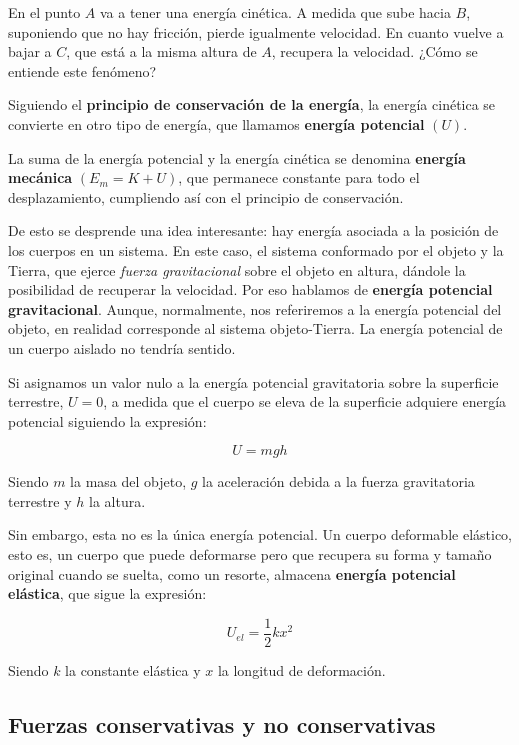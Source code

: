En el punto \(A\) va a tener una energía cinética.
A medida que sube hacia \(B\), suponiendo que no hay fricción,
pierde igualmente velocidad.
En cuanto vuelve a bajar a \(C\), que está a la misma altura de \(A\),
recupera la velocidad. ¿Cómo se entiende este fenómeno?

Siguiendo el \textbf{principio de conservación de la energía}, 
la energía cinética se convierte en otro tipo de energía,
que llamamos \textbf{energía potencial} \((U)\).

La suma de la energía potencial y la energía cinética se denomina 
\textbf{energía mecánica} \((E_m = K + U)\),
que permanece constante para todo el desplazamiento,
cumpliendo así con el principio de conservación.

De esto se desprende una idea interesante:
hay energía asociada a la posición de los cuerpos en un sistema.
En este caso, el sistema conformado por el objeto y la Tierra,
que ejerce \textit{fuerza gravitacional} sobre el objeto en altura,
dándole la posibilidad de recuperar la velocidad.
Por eso hablamos de \textbf{energía potencial gravitacional}.
Aunque, normalmente, nos referiremos a la energía potencial del objeto,
en realidad corresponde al sistema objeto-Tierra. 
La energía potencial de un cuerpo aislado no tendría sentido.

Si asignamos un valor nulo a la energía potencial gravitatoria sobre la 
superficie terrestre, \(U = 0\), a medida que el cuerpo se eleva de la 
superficie adquiere energía potencial siguiendo la expresión:

\begin{equation*}
    U = mgh
\end{equation*}

Siendo \(m\) la masa del objeto, \(g\) la aceleración debida a la fuerza 
gravitatoria terrestre y \(h\) la altura.

Sin embargo, esta no es la única energía potencial.
Un cuerpo deformable elástico,
esto es, un cuerpo que puede deformarse pero que recupera su forma y tamaño 
original cuando se suelta,
como un resorte,
almacena \textbf{energía potencial elástica},
que sigue la expresión:

\begin{equation*}
    U_{el} = \frac{1}{2}kx^{2}
\end{equation*}

Siendo \(k\) la constante elástica y \(x\) la longitud de deformación.

\subsection{Fuerzas conservativas y no conservativas}

